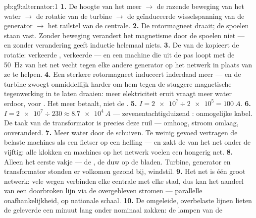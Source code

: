 \begin{solution}{pb:g9:alternator:1}
\textbf{1.} De hoogte van het meer $\to$ de razende beweging van het
water $\to$ de rotatie van de turbine $\to$ de geïnduceerde
wisselspanning van de generator $\to$ het railstel
van de centrale.
\textbf{2.} De rotormagneet draait; de spoelen staan vast. Zonder
beweging verandert het magnetisme door de spoelen niet --- en zonder
verandering geeft inductie helemaal niets.
\textbf{3.} De  van de 
kopieert de rotatie: verkeerde , verkeerde
 --- en een machine die uit de pas loopt met de
\qty{50}{Hz} van het net vecht tegen elke andere
generator op het netwerk in plaats van ze te helpen.
\textbf{4.} Een sterkere rotormagneet induceert inderdaad meer ---
en de turbine zwoegt onmiddellijk harder om hem tegen de stuggere
magnetische tegenwerking in te laten draaien: meer elektriciteit eruit
vraagt meer water erdoor,  voor . Het
meer betaalt, niet de .
\textbf{5.} $I = \num{2e7} \div \num{2e5} = \qty{100}{A}$.
\textbf{6.} $I = \num{2e7} \div 230 \approx \qty{8.7e4}{A}$ ---
zevenentachtigduizend : onmogelijke kabel. De taak van de
transformator is precies deze ruil ---  omhoog, stroom
omlaag,  onveranderd.
\textbf{7.} Meer water door de schuiven. Te weinig gevoed vertragen de
belaste machines als een fietser op een helling --- en zakt de
 van het net onder de vijftig: alle klokken en
machines op het netwerk voelen een hongerig net.
\textbf{8.} Alleen het eerste vakje --- de , de duw op de
bladen. Turbine, generator en transformator stonden er volkomen
gezond bij, windstil.
\textbf{9.} Het net is één groot  netwerk: vele wegen verbinden
elke centrale met elke stad, dus kan het aandeel van een doorbroken
lijn via de overgebleven  stromen --- parallelle
onafhankelijkheid, op nationale schaal.
\textbf{10.} De omgeleide, overbelaste lijnen lieten de geleverde
 een minuut lang onder nominaal zakken: de lampen van de

\end{solution}
